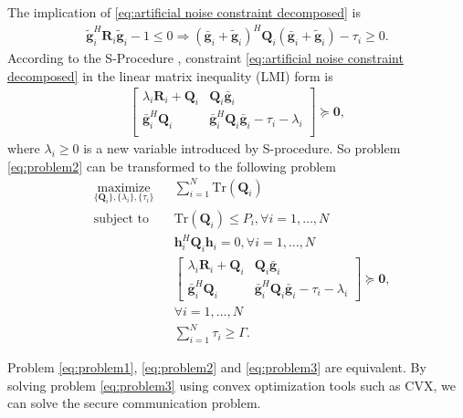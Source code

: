 \documentclass[conference]{IEEEtran}
\begin{document}
The implication of \eqref{eq:artificial noise constraint decomposed} is
\begin{eqnarray}
\tilde{\mathbf{g}}_i^H\mathbf{R}_i\tilde{\mathbf{g}} _i - 1\leq 0  \Rightarrow (\bar{\mathbf{g}}_i+\tilde{\mathbf{g}}_i)^H\mathbf{Q}_i(\bar{\mathbf{g}}_i+\tilde{\mathbf{g}}_i) - \tau_i \geq 0.
\end{eqnarray}
According to the S-Procedure \cite{ConvexOpt_Boyd}, constraint \eqref{eq:artificial noise constraint decomposed}  in the linear matrix inequality (LMI) form is
\begin{eqnarray}
\left[ {\begin{array}{cc}
	\lambda_i\mathbf{R}_i+\mathbf{Q}_i  & \mathbf{Q}_i\bar{\mathbf{g}}_i \\
	\bar{\mathbf{g}}_i^H\mathbf{Q}_i& \bar{\mathbf{g}}_i^H\mathbf{Q}_i\bar{\mathbf{g}} _i- \tau_i -\lambda_i\\
	\end{array} } \right] \succeq \mathbf{0},
\end{eqnarray}
where $\lambda_i \geq 0$ is a new variable introduced by S-procedure. So problem \eqref{eq:problem2} can be transformed to the following problem
\begin{equation}
\begin{aligned} \label{eq:problem3}
& \underset{\{\mathbf{Q}_i\},\{\lambda_i\},\{\tau_i\}}{\text{maximize}}
& & \sum_{i = 1}^{N}\mathrm{Tr}(\mathbf{Q}_i) \\
& \text{subject to}
& & \mathrm{Tr}(\mathbf{Q}_i) \leq P_i, \forall i = 1, \ldots, N\\
&&& \mathbf{h}_i^H \mathbf{Q}_i \mathbf{h}_i= 0, \forall i = 1,\ldots,N\\
&&& \left[ {\begin{array}{cc}
	\lambda_i\mathbf{R}_i+\mathbf{Q}_i  & \mathbf{Q}_i\bar{\mathbf{g}}_i \\
	\bar{\mathbf{g}}_i^H\mathbf{Q}_i & \bar{\mathbf{g}}_i^H\mathbf{Q}_i\bar{\mathbf{g}}_i - \tau_i -\lambda_i
	\end{array} } \right] \succeq \mathbf{0},\\
&&& \forall i = 1, \ldots, N\\
&&&\sum_{i =1}^{N}\tau_i \geq \Gamma.
\end{aligned}
\end{equation}

Problem \eqref{eq:problem1}, \eqref{eq:problem2} and \eqref{eq:problem3} are equivalent. By solving problem \eqref{eq:problem3} using convex optimization tools such as CVX\cite{cvx}, we can solve the secure communication problem.
\end{document}
